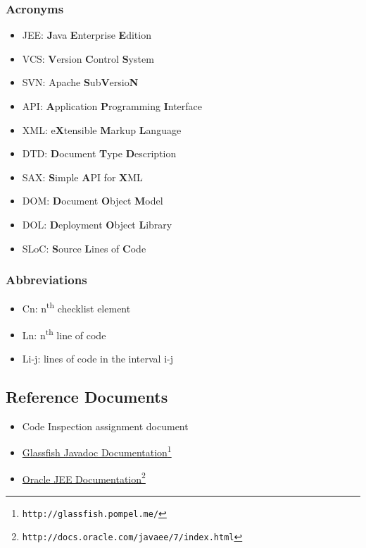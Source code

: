 \subsubsection{Acronyms}
\begin{itemize}
	\item JEE: \textbf{J}ava \textbf{E}nterprise \textbf{E}dition
	\item VCS: \textbf{V}ersion \textbf{C}ontrol \textbf{S}ystem
	\item SVN: Apache \textbf{S}ub\textbf{V}ersio\textbf{N}
	\item API: \textbf{A}pplication \textbf{P}rogramming \textbf{I}nterface
	\item XML: e\textbf{X}tensible \textbf{M}arkup \textbf{L}anguage
	\item DTD: \textbf{D}ocument \textbf{T}ype \textbf{D}escription
	\item SAX: \textbf{S}imple \textbf{A}PI for \textbf{X}ML
	\item DOM: \textbf{D}ocument \textbf{O}bject \textbf{M}odel
	\item DOL: \textbf{D}eployment \textbf{O}bject \textbf{L}ibrary
	\item SLoC: \textbf{S}ource \textbf{L}ines of \textbf{C}ode
\end{itemize}
\subsubsection{Abbreviations}
\begin{itemize}
	\item Cn: n\textsuperscript{th} checklist element
	\item Ln: n\textsuperscript{th} line of code
	\item Li-j: lines of code in the interval i-j
\end{itemize}
\subsection{Reference Documents}
\begin{itemize}
	\item Code Inspection assignment document
	\item \href{http://glassfish.pompel.me/}{Glassfish Javadoc Documentation}\footnote{\texttt{http://glassfish.pompel.me/}}
	\item \href{http://docs.oracle.com/javaee/7/index.html}{Oracle JEE Documentation}\footnote{\texttt{http://docs.oracle.com/javaee/7/index.html}}
\end{itemize}
